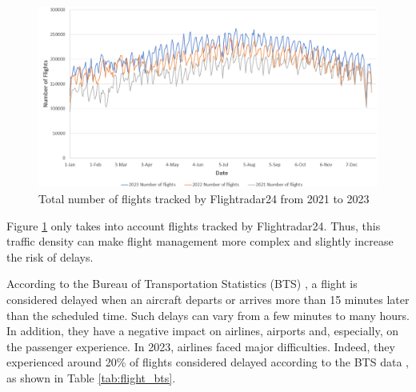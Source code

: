 \documentclass[12pt,oneside]{book} %
\begin{document}
\begin{figure}[H]
 \begin{adjustwidth}{-2cm}{}
    \centering
    \includegraphics[width=1\linewidth]{Image/flights_number.png}
    \end{adjustwidth}
    \caption{Total number of flights tracked by Flightradar24 from 2021 to 2023 \cite{Flightradar24}}
    \label{fig:flights_number}
\end{figure}

\noindent Figure \ref{fig:flights_number} only takes into account flights tracked by Flightradar24. Thus, this traffic density can make flight management more complex and slightly increase the risk of delays.

\noindent According to the Bureau of Transportation Statistics (BTS) \cite{BTS_flight_delays}, a flight is considered delayed when an aircraft departs or arrives more than 15 minutes later than the scheduled time. Such delays can vary from a few minutes to many hours. In addition, they have a negative impact on airlines, airports and, especially, on the passenger experience. In 2023, airlines faced major difficulties. Indeed, they experienced around 20\% of flights considered delayed according to the BTS data \cite{BTS_flight_delays_statistics}, as shown in Table \ref{tab:flight_bts}.
\end{document}
